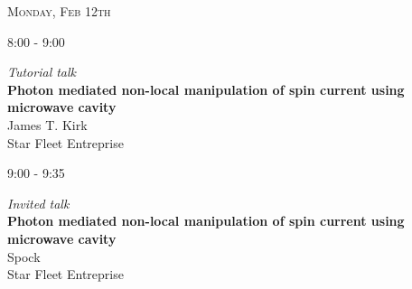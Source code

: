 \begin{tcolorbox}
\textsc{Monday, Feb 12th}
\end{tcolorbox}

\begin{minipage}[t]{.2\textwidth} %
\vskip -8pt \color{red} 8:00 - 9:00
\end{minipage} %
\begin{minipage}[t]{.8\textwidth} %
\textit{Tutorial talk}\\ \vskip -8pt
\textbf{Photon mediated non-local manipulation of spin current using
microwave cavity} \\  \vskip -8pt
James T. Kirk\\
Star Fleet Entreprise\\
\end{minipage}

\begin{minipage}[t]{.2\textwidth} %
\vskip -8pt \color{red} 9:00 - 9:35
\end{minipage} %
\begin{minipage}[t]{.8\textwidth} %
\textit{Invited talk}\\ \vskip -8pt
\textbf{Photon mediated non-local manipulation of spin current using
microwave cavity} \\ \vskip -8pt
Spock\\
Star Fleet Entreprise\\
\end{minipage}
